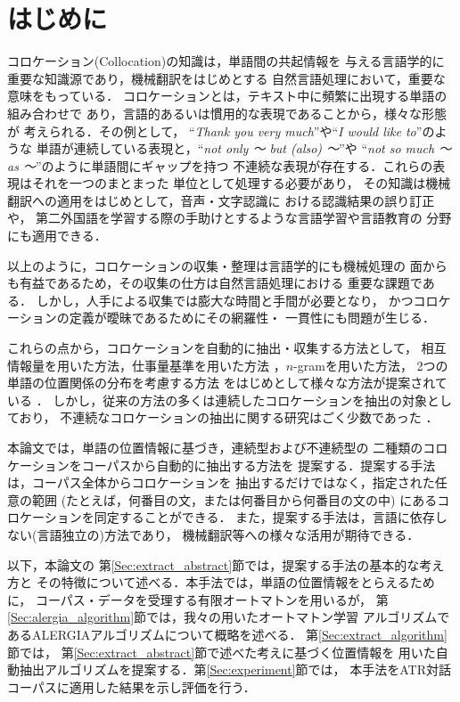\section{はじめに}

コロケーション(Collocation)の知識は，単語間の共起情報を
与える言語学的に重要な知識源であり，機械翻訳をはじめとする
自然言語処理において，重要な意味をもっている．
コロケーションとは，テキスト中に頻繁に出現する単語の組み合わせで
あり，言語的あるいは慣用的な表現であることから，様々な形態が
考えられる．その例として，
``{\it Thank you very much}''や``{\it I would like to}''のような
単語が連続している表現と，``{\it not only 〜 but (also) 〜}''や
``{\it not so much 〜 as 〜}''のように単語間にギャップを持つ
不連続な表現が存在する．これらの表現はそれを一つのまとまった
単位として処理する必要があり，
その知識は機械翻訳への適用をはじめとして，音声・文字認識に
おける認識結果の誤り訂正\cite{Omoto96}や，
第二外国語を学習する際の手助けとするような言語学習や言語教育の
分野にも適用できる\cite{Kita94a,Kita97}．

以上のように，コロケーションの収集・整理は言語学的にも機械処理の
面からも有益であるため，その収集の仕方は自然言語処理における
重要な課題である．
しかし，人手による収集では膨大な時間と手間が必要となり，
かつコロケーションの定義が曖昧であるためにその網羅性・
一貫性にも問題が生じる．

これらの点から，コロケーションを自動的に抽出・収集する方法として，
相互情報量を用いた方法\cite{Church90}，仕事量基準を用いた方法
\cite{Kita93,Kita94b}，$n$-gramを用いた方法\cite{Nagao94}，
2つの単語の位置関係の分布を考慮する方法\cite{Smadja93}
をはじめとして様々な方法が提案されている
\cite{Shinnou94,Shinnou95a,Shinnou95b}．
しかし，従来の方法の多くは連続したコロケーションを抽出の対象としており，
不連続なコロケーションの抽出に関する研究はごく少数であった
\cite{Omoto96,Ikehara95}．

本論文では，単語の位置情報に基づき，連続型および不連続型の
二種類のコロケーションをコーパスから自動的に抽出する方法を
提案する．提案する手法は，コーパス全体からコロケーションを
抽出するだけではなく，指定された任意の範囲
(たとえば，何番目の文，または何番目から何番目の文の中)
にあるコロケーションを同定することができる．
また，提案する手法は，言語に依存しない(言語独立の)方法であり，
機械翻訳等への様々な活用が期待できる．

以下，本論文の
第\ref{Sec:extract_abstract}節では，提案する手法の基本的な考え方と
その特徴について述べる．本手法では，単語の位置情報をとらえるために，
コーパス・データを受理する有限オートマトンを用いるが，
第\ref{Sec:alergia_algorithm}節では，我々の用いたオートマトン学習
アルゴリズムであるALERGIAアルゴリズムについて概略を述べる．
第\ref{Sec:extract_algorithm}節では，
第\ref{Sec:extract_abstract}節で述べた考えに基づく位置情報を
用いた自動抽出アルゴリズムを提案する．第\ref{Sec:experiment}節では，
本手法をATR対話コーパスに適用した結果を示し評価を行う．

